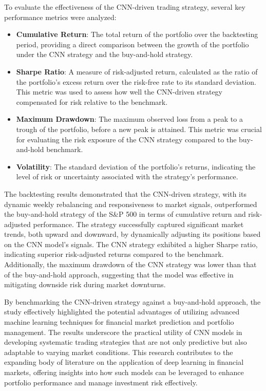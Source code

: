 To evaluate the effectiveness of the CNN-driven trading strategy, several key performance metrics were analyzed:

\begin{itemize}
    \item \textbf{Cumulative Return}: The total return of the portfolio over the backtesting period, providing a direct comparison between the growth of the portfolio under the CNN strategy and the buy-and-hold strategy.
    \item \textbf{Sharpe Ratio}: A measure of risk-adjusted return, calculated as the ratio of the portfolio's excess return over the risk-free rate to its standard deviation. This metric was used to assess how well the CNN-driven strategy compensated for risk relative to the benchmark.
    \item \textbf{Maximum Drawdown}: The maximum observed loss from a peak to a trough of the portfolio, before a new peak is attained. This metric was crucial for evaluating the risk exposure of the CNN strategy compared to the buy-and-hold benchmark.
    \item \textbf{Volatility}: The standard deviation of the portfolio's returns, indicating the level of risk or uncertainty associated with the strategy's performance.
\end{itemize}

The backtesting results demonstrated that the CNN-driven strategy, with its dynamic weekly rebalancing and responsiveness to market signals, outperformed the buy-and-hold strategy of the S\&P 500 in terms of cumulative return and risk-adjusted performance. The strategy successfully captured significant market trends, both upward and downward, by dynamically adjusting its positions based on the CNN model's signals. The CNN strategy exhibited a higher Sharpe ratio, indicating superior risk-adjusted returns compared to the benchmark. Additionally, the maximum drawdown of the CNN strategy was lower than that of the buy-and-hold approach, suggesting that the model was effective in mitigating downside risk during market downturns.

By benchmarking the CNN-driven strategy against a buy-and-hold approach, the study effectively highlighted the potential advantages of utilizing advanced machine learning techniques for financial market prediction and portfolio management. The results underscore the practical utility of CNN models in developing systematic trading strategies that are not only predictive but also adaptable to varying market conditions. This research contributes to the expanding body of literature on the application of deep learning in financial markets, offering insights into how such models can be leveraged to enhance portfolio performance and manage investment risk effectively.

